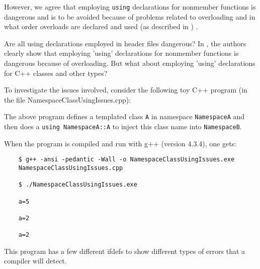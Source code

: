 {}\noindent{}However, we agree that employing {}\texttt{using}
declarations for nonmember functions is dangerous and is to be avoided
because of problems related to overloading and in what order overloads
are declared and used (as described in {}\cite[Item
59]{C++CodingStandards05}) .

Are all using declarations employed in header files dangerous?  In
{}\cite[Item 59]{C++CodingStandards05}, the authors clearly show that
employing 'using' declarations for nonmember functions is dangerous
because of overloading.  But what about employing 'using' declarations
for C++ classes and other types?

To investigate the issues involved, consider the following toy C++ program (in
the file NamespaceClassUsingIssues.cpp):

{\small}

The above program defines a templated class {}\texttt{A} in namespace
{}\texttt{NamespaceA} and then does a {}\texttt{using NamespaceA::A} to inject
this class name into {}\texttt{NamespaceB}.

When the program is compiled and run with g++ (version 4.3.4), one
gets:

{\small\begin{verbatim}
    $ g++ -ansi -pedantic -Wall -o NamespaceClassUsingIssues.exe
    NamespaceClassUsingIssues.cpp
    
    $ ./NamespaceClassUsingIssues.exe 
    
    a=5
    
    a=2
    
    a=2
\end{verbatim}}

This program has a few different ifdefs to show different types of errors that
a compiler will detect.

